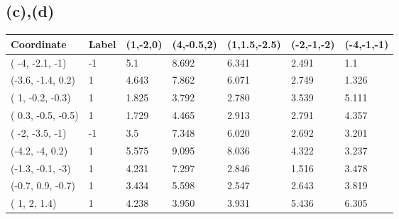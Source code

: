 \documentclass[12pt]{article}
\begin{document}
\subsection*{(c),(d)}
\begin{table}[h!]
\begin{tabular}{lllllll}
\hline
Coordinate           & Label & (1,-2,0)                      & (4,-0.5,2)                    & (1,1.5,-2.5)                  & (-2,-1,-2)                    & (-4,-1,-1)                    \\ \hline
( -4, -2.1, -1)      & -1    & 5.1                           & 8.692                         & 6.341                         & \cellcolor[HTML]{FFFE65}2.491 & \cellcolor[HTML]{FFFE65}1.1   \\
(-3.6, -1.4, 0.2)    & 1     & 4.643                         & 7.862                         & 6.071                         & 2.749                         & \cellcolor[HTML]{FFFE65}1.326 \\
( 1, -0.2, -0.3)     & 1     & \cellcolor[HTML]{FFCC67}1.825 & 3.792                         & \cellcolor[HTML]{FFFE65}2.780 & 3.539                         & 5.111                         \\
( 0.3, -0.5, -0.5)   & 1     & \cellcolor[HTML]{FFFE65}1.729 & 4.465                         & 2.913                         & 2.791                         & 4.357                         \\
( -2, -3.5, -1)      & -1    & 3.5                           & 7.348                         & 6.020                         & 2.692                         & \cellcolor[HTML]{FFCC67}3.201 \\
(-4.2, -4, 0.2)      & 1     & 5.575                         & 9.095                         & 8.036                         & 4.322                         & 3.237                         \\
(-1.3, -0.1, -3)     & 1     & 4.231                         & 7.297                         & 2.846                         & \cellcolor[HTML]{FFFE65}1.516 & 3.478                         \\
(-0.7, 0.9, -0.7)    & 1     & 3.434                         & 5.598                         & \cellcolor[HTML]{FFFE65}2.547 & \cellcolor[HTML]{FFCC67}2.643 & 3.819                         \\
( 1, 2, 1.4)         & 1     & 4.238                         & 3.950                         & 3.931                         & 5.436                         & 6.305                         \\

\end{tabular}
\end{table}
\end{document}
